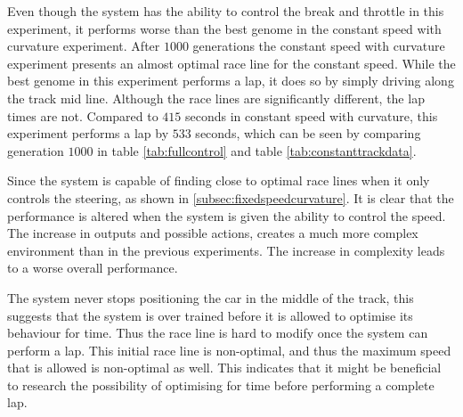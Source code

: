 Even though the system has the ability to control the break and throttle in this experiment, it performs worse than the best genome in the constant speed with curvature experiment. After $1000$ generations the constant speed with curvature experiment presents an almost optimal race line for the constant speed. While the best genome in this experiment performs a lap, it does so by simply driving along the track mid line. Although the race lines are significantly different, the lap times are not. Compared to $415$ seconds in constant speed with curvature, this experiment performs a lap by $533$ seconds, which can be seen by comparing generation $1000$ in table \ref{tab:fullcontrol} and table \ref{tab:constanttrackdata}.

Since the system is capable of finding close to optimal race lines when it only controls the steering, as shown in \ref{subsec:fixedspeedcurvature}. It is clear that the performance is altered when the system is given the ability to control the speed. The increase in outputs and possible actions, creates a much more complex environment than in the previous experiments. The increase in complexity leads to a worse overall performance. 

The system never stops positioning the car in the middle of the track, this suggests that the system is over trained before it is allowed to optimise its behaviour for time. Thus the race line is hard to modify once the system can perform a lap. This initial race line is non-optimal, and thus the maximum speed that is allowed is non-optimal as well. This indicates that it might be beneficial to research the possibility of optimising for time before performing a complete lap.



